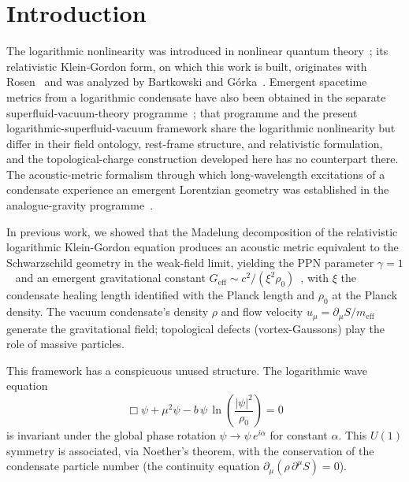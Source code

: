 \documentclass[12pt, a4paper]{article}
\newcommand{\Geff}{G_{\mathrm{eff}}}
\newcommand{\meff}{m_{\mathrm{eff}}}
\begin{document}
\section{Introduction}
\label{sec:intro}

The logarithmic nonlinearity was introduced in nonlinear quantum theory~\cite{bialynicki_birula_1979}; its relativistic Klein-Gordon form, on which this work is built, originates with Rosen~\cite{rosen_1969} and was analyzed by Bartkowski and G\'{o}rka~\cite{bartkowski_gorka_2008}. Emergent spacetime metrics from a logarithmic condensate have also been obtained in the separate superfluid-vacuum-theory programme~\cite{zloshchastiev_2023}; that programme and the present logarithmic-superfluid-vacuum framework share the logarithmic nonlinearity but differ in their field ontology, rest-frame structure, and relativistic formulation, and the topological-charge construction developed here has no counterpart there. The acoustic-metric formalism through which long-wavelength excitations of a condensate experience an emergent Lorentzian geometry was established in the analogue-gravity programme~\cite{unruh_1981,visser_1998,volovik_2003}.

In previous work, we showed that the Madelung decomposition of the relativistic logarithmic Klein-Gordon equation produces an acoustic metric equivalent to the Schwarzschild geometry in the weak-field limit, yielding the PPN parameter $\gamma = 1$~\cite{kulangiev_2026a,unruh_1981,visser_1998} and an emergent gravitational constant $\Geff \sim c^2/(\xi^2\rho_0)$~\cite{kulangiev_2026b,kulangiev_2026e}, with $\xi$ the condensate healing length identified with the Planck length and $\rho_0$ at the Planck density. The vacuum condensate's density $\rho$ and flow velocity $u_\mu = \partial_\mu S/\meff$ generate the gravitational field; topological defects
(vortex-Gaussons) play the role of massive particles.

This framework has a conspicuous unused structure. The logarithmic wave equation
\begin{equation}
    \Box\psi + \mu^2\psi
    - b\,\psi\,\ln\!\left(\frac{|\psi|^2}{\rho_0}\right)
    = 0
\label{eq:log_kg}
\end{equation}
is invariant under the global phase rotation $\psi \to \psi\,e^{i\alpha}$ for constant $\alpha$. This $U(1)$ symmetry is associated, via Noether's theorem, with the conservation of the condensate particle number (the continuity equation $\partial_\mu(\rho\,\partial^\mu S) = 0$).
\end{document}
